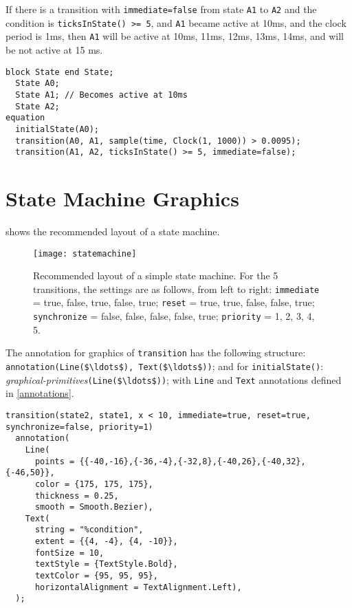 \begin{example}
If there is a transition with \lstinline!immediate=false! from
state \lstinline!A1! to \lstinline!A2! and the condition is \lstinline!ticksInState() >= 5!, and \lstinline!A1! became
active at 10ms, and the clock period is 1ms, then \lstinline!A1! will be active at
10ms, 11ms, 12ms, 13ms, 14ms, and will be not active at 15 ms.
\begin{lstlisting}[language=modelica]
  block State end State;
  State A0;
  State A1; // Becomes active at 10ms
  State A2;
equation
  initialState(A0);
  transition(A0, A1, sample(time, Clock(1, 1000)) > 0.0095);
  transition(A1, A2, ticksInState() >= 5, immediate=false);
\end{lstlisting}
\end{example}

\section{State Machine Graphics}\label{state-machine-graphics}

\begin{nonnormative}
 shows the recommended layout of a state machine.
\end{nonnormative}

\begin{figure}[H]
  \begin{center}
    \texttt{[image: statemachine]}
  \end{center}
  \caption{Recommended layout of a simple state machine.  For the 5 transitions, the settings are as follows, from left to right: \lstinline!immediate! = true, false, true, false, true; \lstinline!reset! = true, true, false, false, true; \lstinline!synchronize! = false, false, false, false, true; \lstinline!priority! = 1, 2, 3, 4, 5.}
  \label{fig:state-machine-layout}
\end{figure}

The annotation for graphics of \lstinline!transition! has the following
structure: \lstinline!annotation(Line($\ldots$), Text($\ldots$))!; and for
\lstinline!initialState()!: \emph{graphical-primitives}\lstinline!(Line($\ldots$))!; with \lstinline!Line!
and \lstinline!Text! annotations defined in \cref{annotations}.

\begin{example}
\begin{lstlisting}[language=modelica]
transition(state2, state1, x < 10, immediate=true, reset=true, synchronize=false, priority=1)
  annotation(
    Line(
      points = {{-40,-16},{-36,-4},{-32,8},{-40,26},{-40,32},{-46,50}},
      color = {175, 175, 175},
      thickness = 0.25,
      smooth = Smooth.Bezier),
    Text(
      string = "%condition",
      extent = {{4, -4}, {4, -10}},
      fontSize = 10,
      textStyle = {TextStyle.Bold},
      textColor = {95, 95, 95},
      horizontalAlignment = TextAlignment.Left),
  );
\end{lstlisting}
\end{example}


